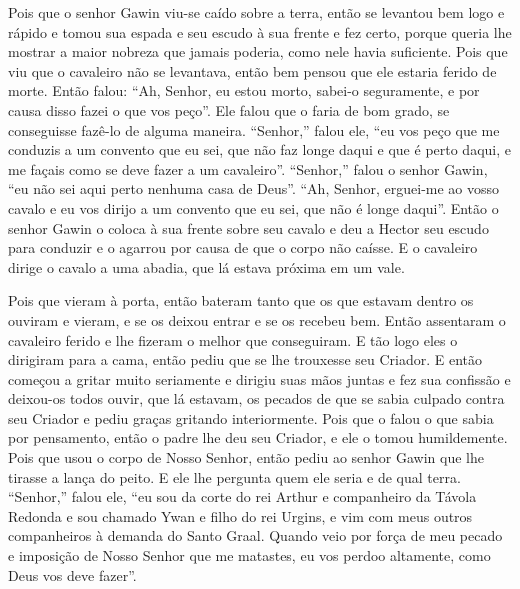 Pois que o senhor Gawin viu-se caído sobre a terra, então se levantou bem logo e
rápido e tomou sua espada e seu escudo à sua frente e fez certo, porque queria
lhe mostrar a maior nobreza que jamais poderia, como nele havia suficiente.
Pois que viu que o cavaleiro não se levantava, então bem pensou que ele estaria
ferido de morte. Então falou: “Ah, Senhor, eu estou morto, sabei-o
seguramente, e por causa disso fazei o que vos peço”. Ele falou que o faria de
bom grado, se conseguisse fazê-lo de alguma maneira. “Senhor,” falou ele, “eu
vos peço que me conduzis a um convento que eu sei, que não faz longe daqui e
que é perto daqui, e me façais como se deve fazer a um cavaleiro”. “Senhor,”
falou o senhor Gawin, “eu não sei aqui perto nenhuma casa de Deus”. “Ah,
Senhor, erguei-me ao vosso cavalo e eu vos dirijo a um convento que eu sei, que
não é longe daqui”. Então o senhor Gawin o coloca à sua frente sobre seu cavalo
e deu a Hector seu escudo para conduzir e o agarrou por causa de que o corpo
não caísse. E o cavaleiro dirige o cavalo a uma abadia, que lá estava próxima
em um vale.

Pois que vieram à porta, então bateram tanto que os que estavam dentro os
ouviram e vieram, e se os deixou entrar e se os recebeu bem. Então assentaram o
cavaleiro ferido e lhe fizeram o melhor que conseguiram. E tão logo eles o
dirigiram para a cama, então pediu que se lhe trouxesse seu Criador. E então
começou a gritar muito seriamente e dirigiu suas mãos juntas e fez sua
confissão e deixou-os todos ouvir, que lá estavam, os pecados de que se sabia
culpado contra seu Criador e pediu graças gritando interiormente. Pois que o
falou o que sabia por pensamento, então o padre lhe deu seu Criador, e ele o
tomou humildemente. Pois que usou o corpo de Nosso Senhor, então pediu ao
senhor Gawin que lhe tirasse a lança do peito. E ele lhe pergunta quem ele
seria e de qual terra. “Senhor,” falou ele, “eu sou da corte do rei Arthur e
companheiro da Távola Redonda e sou chamado Ywan e filho do rei Urgins, e vim
com meus outros companheiros à demanda do Santo Graal. Quando veio por força de
meu pecado e imposição de Nosso Senhor que me matastes, eu vos perdoo
altamente, como Deus vos deve fazer”.

